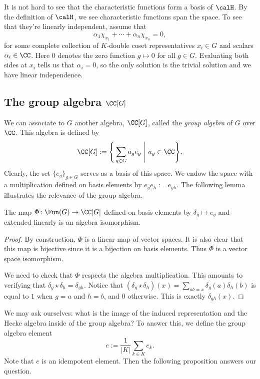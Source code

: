 It is not hard to see that the characteristic functions form a basis of $\calH$.
By the definition of $\calH$, we see characteristic functions span the space.
To see that they're linearly independent, assume that
\[
	\alpha_1 \chi_{x_1} + \cdots + \alpha_n \chi_{x_n}  = 0,
\]
for some complete collection of $K$-double coset representatives $x_i\in G$ and scalars $\alpha_i\in\CC$.
Here $0$ denotes the zero function $g\mapsto 0$ for all $g\in G$.
Evaluating both sides at $x_i$ tells us that $\alpha_i=0$, so the only solution is the trivial solution and we have linear independence.


\subsection{The group algebra $\CC[G]$}\label{Section1.4}
We can associate to $G$ another algebra, $\CC[G]$, called the \emph{group algebra} of $G$ over $\CC$.
This algebra is defined by
\[
	\CC[G] := \Bigg\{ \sum_{g\in G} a_g e_g\ \Bigg|\ a_g\in \CC \Bigg\}.
\]
Clearly, the set $\{e_g\}_{g\in G}$ serves as a basis of this space.
We endow the space with a multiplication defined on basis elements by $e_ge_h := e_{gh}$.
The following lemma illustrates the relevance of the group algebra.
\begin{lem}
	The map $\Phi\colon \Fun(G)\to\CC[G]$ defined on basis elements by $\delta_g\mapsto e_g$ and extended linearly is an algebra isomorphism.
\end{lem}
\begin{proof}
	By construction, $\Phi$ is a linear map of vector spaces.
	It is also clear that this map is bijective since it is a bijection on basis elements.
	Thus $\Phi$ is a vector space isomorphism.

	We need to check that $\Phi$ respects the algebra multiplication.
	This amounts to verifying that $\delta_g \star \delta_h = \delta_{gh}$.
	Notice that $(\delta_g\star\delta_h)(x) = \sum_{ab=x} \delta_g(a)\delta_h(b)$ is equal to $1$ when $g=a$ and $h=b$, and $0$ otherwise.
	This is exactly $\delta_{gh}(x)$.
\end{proof}
We may ask ourselves: what is the image of the induced representation and the Hecke algebra inside of the group algebra? To answer this, we define the group algebra element
\[
	e := \frac{1}{|K|} \sum_{k\in K} e_k.
\]
Note that $e$ is an idempotent element.
Then the following proposition answers our question.
